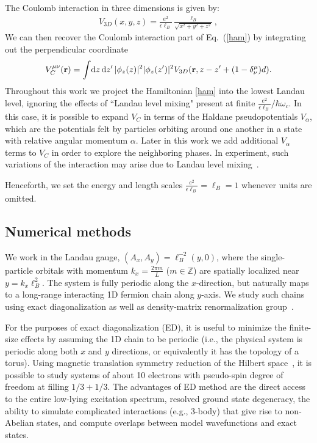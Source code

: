 The Coulomb interaction in three dimensions is given by:
\begin{align}
	V_{3D}(x,y,z)=\frac{e^2}{\epsilon \ell_B}\frac{\ell_B}{\sqrt{x^2+y^2+z^2}},
\end{align}
We can then recover the Coulomb interaction part of Eq.~(\ref{ham}) by integrating out the perpendicular coordinate
\begin{equation}
	V_C^{\mu\nu}({\mathbf{r}})=\int\! \mathrm{d} z \, \mathrm{d} z^\prime \, |\phi_z(z)|^2 |\phi_z(z^\prime)|^2
	\\ V_{3D}({\mathbf{r}},z - z^\prime +  (1-\delta^\mu_\nu) d) .
\end{equation}
Throughout this work we project the Hamiltonian \eqref{ham} into the lowest Landau level,  ignoring the effects of ``Landau level mixing"  present at finite $ \frac{e^2}{\epsilon\ell_B} / \hbar \omega_c$.
In this case, it is possible to expand $V_C$ in terms of the Haldane pseudopotentials $V_\alpha$, which are the potentials felt by particles orbiting around one another in a state with relative angular momentum $\alpha$.
Later in this work we add additional $V_\alpha$ terms to $V_C$ in order to explore the neighboring phases.
In experiment, such variations of the interaction may arise due to Landau level mixing~\cite{BisharaNayakMixing, WojsMixing, RezayiSimonMixing, Papic12, SodemannMixing, PetersonMixing, SimonRezayiMixing, ZaletelMixing, PakrouskiMixing}.

Henceforth, we set the energy and length scales $\frac{e^2}{\epsilon\ell_B} = \ell_B = 1$ whenever units are omitted.


\subsection{Numerical methods}\label{sec:numerics}

We work in the Landau gauge, $(A_x,A_y)=\ell_B^{-2}(y,0)$, where the single-particle orbitals with momentum $k_x=\frac{2\pi m}{L}$ ($m \in \mathbb{Z}$) are spatially localized near $y = k_x \ell_B^2$. 
The system is fully periodic along the $x$-direction, but naturally maps to a long-range interacting 1D fermion chain along $y$-axis.
We study such chains using exact diagonalization as well as density-matrix renormalization group~\cite{ZaletelQHdmrg13, ZaletelMixing}.

For the purposes of exact diagonalization (ED), it is useful to minimize the finite-size effects by assuming the 1D chain to be periodic (i.e., the physical system is  periodic along both $x$ and $y$ directions, or equivalently it has the topology of a torus). 
Using magnetic translation symmetry reduction of the Hilbert space~\cite{Haldane-PhysRevLett.55.2095}, it is possible to study systems of about 10 electrons with pseudo-spin degree of freedom at filling $1/3+1/3$. 
The advantages of ED method are the direct access to the entire low-lying excitation spectrum, resolved ground state degeneracy, the ability to simulate complicated interactions (e.g., 3-body) that give rise to non-Abelian states, and compute overlaps between model wavefunctions and exact states.

